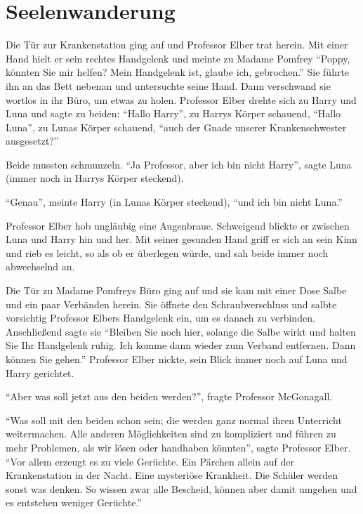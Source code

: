 \chapter{Seelenwanderung}


Die Tür zur Krankenstation ging auf und Professor Elber trat herein. Mit einer Hand hielt er sein rechtes Handgelenk und meinte zu Madame Pomfrey \enquote{Poppy, könnten Sie mir helfen? Mein Handgelenk ist, glaube ich, gebrochen.} Sie führte ihn an das Bett nebenan und untersuchte seine Hand. Dann verschwand sie wortlos in ihr Büro, um etwas zu holen. Professor Elber drehte sich zu Harry und Luna und sagte zu beiden: \enquote{Hallo Harry}, zu Harrys Körper schauend, \enquote{Hallo Luna}, zu Lunas Körper schauend, \enquote{auch der Gnade unserer Krankenschwester ausgesetzt?}

Beide mussten schmunzeln. \enquote{Ja Professor, aber ich bin nicht Harry}, sagte Luna (immer noch in Harrys Körper steckend).

\enquote{Genau}, meinte Harry (in Lunas Körper steckend), \enquote{und ich bin nicht Luna.}

Professor Elber hob ungläubig eine Augenbraue. Schweigend blickte er zwischen Luna und Harry hin und her. Mit seiner gesunden Hand griff er sich an sein Kinn und rieb es leicht, so als ob er überlegen würde, und sah beide immer noch abwechselnd an.

Die Tür zu Madame Pomfreys Büro ging auf und sie kam mit einer Dose Salbe und ein paar Verbänden herein. Sie öffnete den Schraubverschluss und salbte vorsichtig Professor Elbers Handgelenk ein, um es danach zu verbinden. Anschließend sagte sie \enquote{Bleiben Sie noch hier, solange die Salbe wirkt und halten Sie Ihr Handgelenk ruhig. Ich komme dann wieder zum Verband entfernen. Dann können Sie gehen.} Professor Elber nickte, sein Blick immer noch auf Luna und Harry gerichtet.

\enquote{Aber was soll jetzt aus den beiden werden?}, fragte Professor McGonagall.

\enquote{Was soll mit den beiden schon sein; die werden ganz normal ihren Unterricht weitermachen. Alle anderen Möglichkeiten sind zu kompliziert und führen zu mehr Problemen, als wir lösen oder handhaben könnten}, sagte Professor Elber. \enquote{Vor allem erzeugt es zu viele Gerüchte. Ein Pärchen allein auf der Krankenstation in der Nacht. Eine mysteriöse Krankheit. Die Schüler werden sonst was denken. So wissen zwar alle Bescheid, können aber damit umgehen und es entstehen weniger Gerüchte.}

